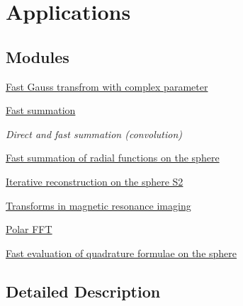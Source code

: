 \hypertarget{group__applications}{\section{Applications}
\label{group__applications}
}
\subsection*{Modules}
\begin{DoxyCompactItemize}
\item 
\hyperlink{group__applications__fastgauss}{Fast Gauss transfrom with complex parameter}
\item 
\hyperlink{group__applications__fastsum}{Fast summation}
\begin{DoxyCompactList}\small\item\em Direct and fast summation (convolution) \end{DoxyCompactList}\item 
\hyperlink{group__applications__fastsumS2}{Fast summation of radial functions on the sphere}
\item 
\hyperlink{group__applications__iterS2}{Iterative reconstruction on the sphere S2}
\item 
\hyperlink{group__applications__mri}{Transforms in magnetic resonance imaging}
\item 
\hyperlink{group__applications__polarFFT}{Polar F\-F\-T}
\item 
\hyperlink{group__applications__quadratureS2}{Fast evaluation of quadrature formulae on the sphere}
\end{DoxyCompactItemize}


\subsection{Detailed Description}
